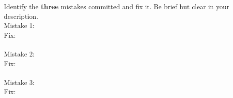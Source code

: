 \documentclass[12pt, oneside]{article}
\newcommand{\noi}{\noindent}
\begin{document}
\noi
Identify the {\bf three} mistakes committed and fix it.  Be brief but clear in your description.\\

\vspace{.15in}
\noi
Mistake 1: \underline{\hspace{6in}} \\

Fix: \underline{\hspace{4in}}\\
\\
\noi
Mistake 2: \underline{\hspace{6in}} \\

Fix: \underline{\hspace{4in}}\\
\\
\noi
Mistake 3: \underline{\hspace{6in}} \\

Fix: \underline{\hspace{4in}}\\
\\
\end{document}
